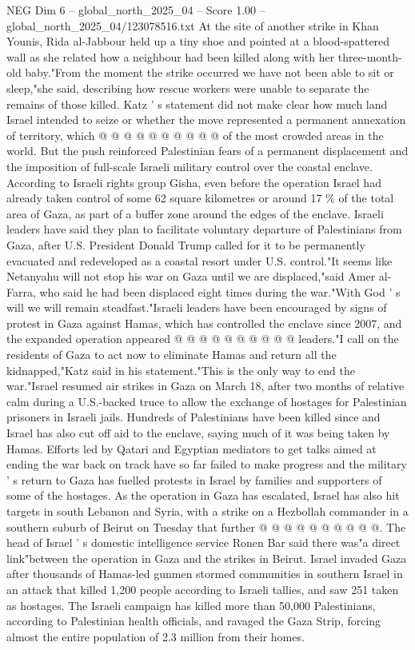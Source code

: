 \begin{textsample}{NEG Dim 6 – global\_north\_2025\_04 – Score 1.00 – global\_north\_2025\_04/123078516.txt}
At the site of another strike in Khan Younis, Rida al-Jabbour held up a tiny shoe and pointed at a blood-spattered wall as she related how a neighbour had been killed along with her three-month-old baby."From the moment the strike occurred we have not been able to sit or sleep,"she said, describing how rescue workers were unable to separate the remains of those killed.
Katz ' s statement did not make clear how much land Israel intended to seize or whether the move represented a permanent annexation of territory, which @ @ @ @ @ @ @ @ @ @ of the most crowded areas in the world.
But the push reinforced Palestinian fears of a permanent displacement and the imposition of full-scale Israeli military control over the coastal enclave.
According to Israeli rights group Gisha, even before the operation Israel had already taken control of some 62 square kilometres or around 17 \% of the total area of Gaza, as part of a buffer zone around the edges of the enclave.
Israeli leaders have said they plan to facilitate voluntary departure of Palestinians from Gaza, after U.S.
President Donald Trump called for it to be permanently evacuated and redeveloped as a coastal resort under U.S. control."It seems like Netanyahu will not stop his war on Gaza until we are displaced,"said Amer al-Farra, who said he had been displaced eight times during the war."With God ' s will we will remain steadfast."Israeli leaders have been encouraged by signs of protest in Gaza against Hamas, which has controlled the enclave since 2007, and the expanded operation appeared @ @ @ @ @ @ @ @ @ @ leaders."I call on the residents of Gaza to act now to eliminate Hamas and return all the kidnapped,"Katz said in his statement."This is the only way to end the war."Israel resumed air strikes in Gaza on March 18, after two months of relative calm during a U.S.-backed truce to allow the exchange of hostages for Palestinian prisoners in Israeli jails.
Hundreds of Palestinians have been killed since and Israel has also cut off aid to the enclave, saying much of it was being taken by Hamas.
Efforts led by Qatari and Egyptian mediators to get talks aimed at ending the war back on track have so far failed to make progress and the military ' s return to Gaza has fuelled protests in Israel by families and supporters of some of the hostages.
As the operation in Gaza has escalated, Israel has also hit targets in south Lebanon and Syria, with a strike on a Hezbollah commander in a southern suburb of Beirut on Tuesday that further @ @ @ @ @ @ @ @ @ @.
The head of Israel ' s domestic intelligence service Ronen Bar said there was"a direct link"between the operation in Gaza and the strikes in Beirut.
Israel invaded Gaza after thousands of Hamas-led gunmen stormed communities in southern Israel in an attack that killed 1,200 people according to Israeli tallies, and saw 251 taken as hostages.
The Israeli campaign has killed more than 50,000 Palestinians, according to Palestinian health officials, and ravaged the Gaza Strip, forcing almost the entire population of 2.3 million from their homes.

\end{textsample}
